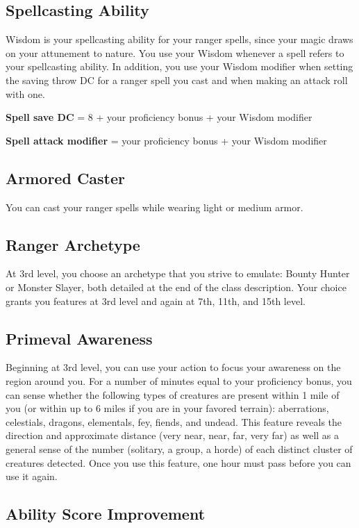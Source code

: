 \subsection{Spellcasting Ability}

Wisdom is your spellcasting ability for your ranger spells, since your magic draws on your attunement to nature. You use your Wisdom whenever a spell refers to your spellcasting ability. In addition, you use your Wisdom modifier when setting the saving throw DC for a ranger spell you cast and when making an attack roll with one.

\textbf{Spell save DC} = 8 + your proficiency bonus + your Wisdom modifier

\textbf{Spell attack modifier} = your proficiency bonus + your Wisdom modifier

\subsection{Armored Caster}
You can cast your ranger spells while wearing light or medium armor.

\subsection{Ranger Archetype}

At 3rd level, you choose an archetype that you strive to emulate: Bounty Hunter or Monster Slayer, both detailed at the end of the class description. Your choice grants you features at 3rd level and again at 7th, 11th, and 15th level.

\subsection{Primeval Awareness}

Beginning at 3rd level, you can use your action to focus your awareness on the region around you. For a number of minutes equal to your proficiency bonus, you can sense whether the following types of creatures are present within 1 mile of you (or within up to 6 miles if you are in your favored terrain): aberrations, celestials, dragons, elementals, fey, fiends, and undead. This feature reveals the direction and approximate distance (very near, near, far, very far) as well as a general sense of the number (solitary, a group, a horde) of each distinct cluster of creatures detected. Once you use this feature, one hour must pass before you can use it again.

\subsection{Ability Score Improvement}

